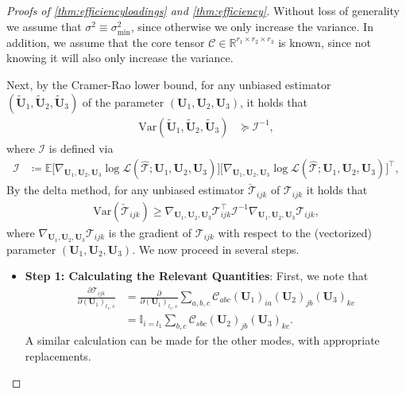 \documentclass[10pt]{article}
\newcommand{\0}{{\mathbf{0}}}
\newcommand{\1}{{\mathbf{1}}}
\newcommand{\E}{{\mathbf{E}}}
\newcommand{\U}{{\mathbf{U}}}
\renewcommand{\t}{^{\top}}
\newcommand{\inv}{^{-1}}
\renewcommand{\E}{\mathbb{E}}
\newcommand{\del}{\partial}
\renewcommand{\tilde}{\widetilde}
\renewcommand{\hat}{\widehat}
\renewcommand{\hat}{\widehat}
\begin{document}
\begin{proof}[Proofs of \cref{thm:efficiencyloadings} and \cref{thm:efficiency}]
Without loss of generality we assume that $\sigma^2 \equiv \sigma^2_{\min}$, since otherwise  we only increase the variance.  In addition, we assume that the core tensor $\mathcal{C} \in \mathbb{R}^{r_1 \times r_2 \times r_3}$ is known, since not knowing it will also only increase the variance. 

Next, by the Cramer-Rao lower bound, for any unbiased estimator $(\tilde \U_1, \tilde \U_2, \tilde \U_3)$ of the parameter $(\U_1, \U_2, \U_3)$, it holds that
\begin{align*}
    \mathrm{Var} (\tilde \U_1, \tilde \U_2, \tilde \U_3) &\succcurlyeq \mathcal{I}\inv,
\end{align*}
where $\mathcal{I}$ is defined via
\begin{align*}
    \mathcal{I} &\coloneqq \E \bigg[\nabla_{\U_1, \U_2,\U_3} \log \mathcal{L}(\mathcal{\hat T}; \U_1, \U_2, \U_3)\bigg] \bigg[ \nabla_{\U_1, \U_2,\U_3} \log \mathcal{L}(\mathcal{\hat T}; \U_1, \U_2, \U_3)\bigg]\t,
\end{align*}
By the delta method, for any unbiased estimator $\mathcal{\check T}_{ijk}$ of $\mathcal{T}_{ijk}$ it holds that
\begin{align*}
    \mathrm{Var}(\mathcal{\check T}_{ijk}) \geq \nabla_{\U_1,\U_2,\U_3} \mathcal{T}_{ijk}\t  \mathcal{I}\inv\nabla_{\U_1,\U_2,\U_3} \mathcal{T}_{ijk}, 
\end{align*}
where $\nabla_{\U_1,\U_2,\U_3} \mathcal{T}_{ijk}$ is the gradient of $\mathcal{T}_{ijk}$ with respect to the (vectorized) parameter $(\U_1, \U_2,\U_3)$.  
We now proceed in several steps. 
\begin{itemize}
    \item \textbf{Step 1: Calculating the Relevant Quantities}: 
 First, we note that
\begin{align}
    \frac{\del \mathcal{T}_{ijk}}{\del (\U_1)_{l_1,s}} &= \frac{\del}{\del (\U_1)_{l_1,s}} \sum_{a,b,c} \mathcal{C}_{abc} (\U_1)_{ia} (\U_2)_{jb} (\U_3)_{kc} \nonumber \\
    &= \mathbb{I}_{i = l_1} \sum_{b,c} \mathcal{C}_{sbc} (\U_2)_{jb} (\U_3)_{kc}. \label{eq:tijkpartial}
\end{align}
A similar calculation can be made for the other modes, with appropriate replacements.


\end{itemize}
\end{proof}
\end{document}
